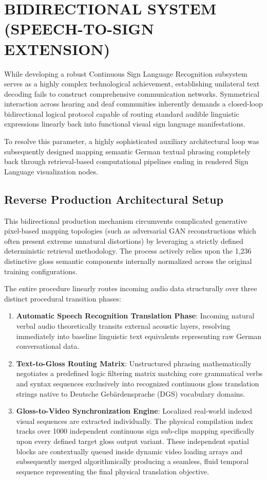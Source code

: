 \chapter{BIDIRECTIONAL SYSTEM (SPEECH-TO-SIGN EXTENSION)}

While developing a robust Continuous Sign Language Recognition subsystem serves as a highly complex technological achievement, establishing unilateral text decoding fails to construct comprehensive communication networks. Symmetrical interaction across hearing and deaf communities inherently demands a closed-loop bidirectional logical protocol capable of routing standard audible linguistic expressions linearly back into functional visual sign language manifestations.

To resolve this parameter, a highly sophisticated auxiliary architectural loop was subsequently designed mapping semantic German textual phrasing completely back through retrieval-based computational pipelines ending in rendered Sign Language visualization nodes.

\section{Reverse Production Architectural Setup}

This bidirectional production mechanism circumvents complicated generative pixel-based mapping topologies (such as adversarial GAN reconstructions which often present extreme unnatural distortions) by leveraging a strictly defined deterministic retrieval methodology. The process actively relies upon the 1,236 distinctive gloss semantic components internally normalized across the original training configurations.

The entire procedure linearly routes incoming audio data structurally over three distinct procedural transition phases:
\begin{enumerate}
    \item \textbf{Automatic Speech Recognition Translation Phase}: Incoming natural verbal audio theoretically transits external acoustic layers, resolving immediately into baseline linguistic text equivalents representing raw German conversational data.
    \item \textbf{Text-to-Gloss Routing Matrix}: Unstructured phrasing mathematically negotiates a predefined logic filtering matrix matching core grammatical verbs and syntax sequences exclusively into recognized continuous gloss translation strings native to Deutsche Gebärdensprache (DGS) vocabulary domains.
    \item \textbf{Gloss-to-Video Synchronization Engine}: Localized real-world indexed visual sequences are extracted individually. The physical compilation index tracks over 1000 independent continuous sign sub-clips mapping specifically upon every defined target gloss output variant. These independent spatial blocks are contextually queued inside dynamic video loading arrays and subsequently merged algorithmically producing a seamless, fluid temporal sequence representing the final physical translation objective.
\end{enumerate}

